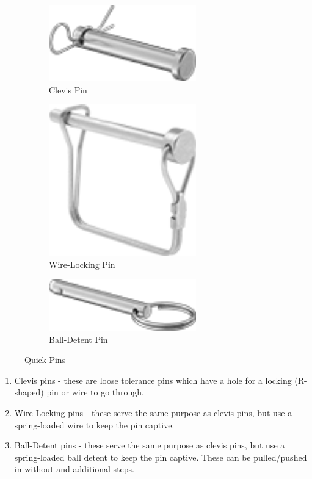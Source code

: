 \documentclass[10pt,letterpaper]{book}
\begin{document}
	\begin{figure}[H]
		\centering
		\begin{subfigure}[b]{.32\linewidth}
			\includegraphics[width=0.7\textwidth]{imgs/cpin.png}
			\caption{Clevis Pin}
		\end{subfigure}\begin{subfigure}[b]{.32\linewidth}
			\includegraphics[width=0.7\textwidth]{imgs/wlpin.png}
			\caption{Wire-Locking Pin}
		\end{subfigure}\begin{subfigure}[b]{.32\linewidth}
			\includegraphics[width=0.7\textwidth]{imgs/bdpin.png}
			\caption{Ball-Detent Pin}
		\end{subfigure}
		\caption{Quick Pins}
	\end{figure}
	
	\begin{enumerate}[label=\alph*]
		\item Clevis pins - these are loose tolerance pins which have a hole for a locking (R-shaped) pin or wire to go through.
		\item Wire-Locking pins - these serve the same purpose as clevis pins, but use a spring-loaded wire to keep the pin captive.
		\item Ball-Detent pins - these serve the same purpose as clevis pins, but use a spring-loaded ball detent to keep the pin captive. These can be pulled/pushed in without and additional steps.
	\end{enumerate}
	
\end{document}
